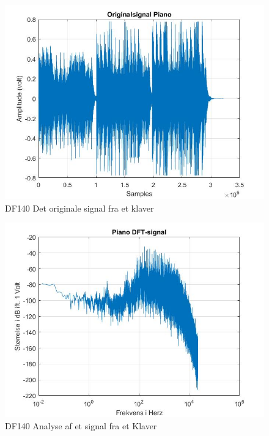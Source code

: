 \begin{figure}[H]
	\centering
	\includegraphics[width=140mm]{figures/Piano/original.jpg}
	\caption{DF140 Det originale signal fra et klaver}
	\label{fig:Klaver original}
\end{figure}

\begin{figure}[H]
	\centering
	\includegraphics[width=140mm]{figures/Piano/DFT.jpg}
	\caption{DF140 Analyse af et signal fra et Klaver}
	\label{fig:Klaver DF140}
\end{figure}

